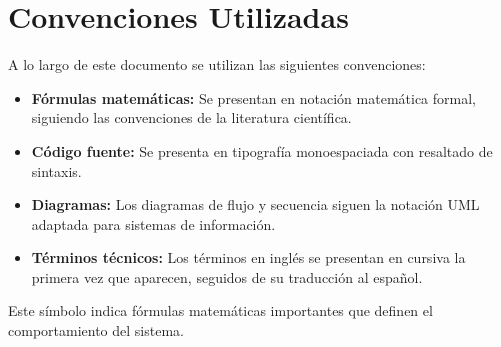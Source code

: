 \bigskip

\section*{Convenciones Utilizadas}

A lo largo de este documento se utilizan las siguientes convenciones:

\begin{itemize}
    \item \textbf{Fórmulas matemáticas:} Se presentan en notación matemática formal, siguiendo las convenciones de la literatura científica.
    \item \textbf{Código fuente:} Se presenta en tipografía monoespaciada con resaltado de sintaxis.
    \item \textbf{Diagramas:} Los diagramas de flujo y secuencia siguen la notación UML adaptada para sistemas de información.
    \item \textbf{Términos técnicos:} Los términos en inglés se presentan en cursiva la primera vez que aparecen, seguidos de su traducción al español.
\end{itemize}

\bigskip

\begin{cajaFormula}
Este símbolo indica fórmulas matemáticas importantes que definen el comportamiento del sistema.
\end{cajaFormula}

\vfill
\newpage
